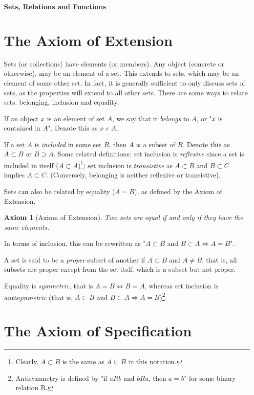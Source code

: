 \documentclass[12pt]{article}
\newtheorem{axiom}{Axiom}
\begin{document}
\begin{center}\LARGE\bf
    Sets, Relations and Functions
\end{center}

\section{The Axiom of Extension}
Sets (or collections) have elements (or members). Any object (concrete or otherwise), may be an element
of a set. This extends to sets, which may be an element of some other set. In fact, it is generally sufficient
to only discuss sets of sets, as the properties will extend to all other sets. There are some ways to relate sets: belonging, inclusion and equality.

If an object $x$ is an element of set $A$, we say that it \textit{belongs} to $A$, or "$x$ is contained
in $A$". Denote this as $x$ $\epsilon$ $A$.

If a set $A$ is \textit{included} in some set $B$, then $A$ is a subset of $B$. Denote this as $A \subset B$ or
$B \supset A$. Some related definitions: set inclusion is \textit{reflexive} since a set is included in
itself ($A \subset A$)\footnote{Clearly, $A \subset B$ is the same as $A \subseteq B$ in this notation.}; set inclusion is \textit{transistive} as $A \subset B$ and $B \subset C$ implies
$A \subset C$. (Conversely, belonging is neither reflexive or transistive).

Sets can also be related by equality ($A = B$), as defined by the Axiom of Extension.
\begin{axiom}[Axiom of Extension]
    Two sets are equal if and only if they have the same elements.
\end{axiom}
In terms of  inclusion, this can be rewritten as "$A \subset B$ and $B \subset A \Leftrightarrow A = B$".

A set is said to be a \textit{proper} subset of another if $A \subset B$ and $A \neq B$, that is, all
subsets are proper except from the set itslf, which is a subset but not proper.

Equality is \textit{symmetric}, that is $A = B \Leftrightarrow B = A$, whereas set inclusion is \textit{antisymmetric}
(that is, $A \subset B$ and $B \subset A \Rightarrow A = B$)\footnote{Antisymmetry is defined by "if $aRb$ and $bRa$, then $a = b$" for
some binary relation R.}.

\section{The Axiom of Specification}
\end{document}
